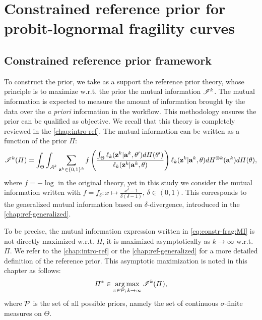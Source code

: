 \section{Constrained reference prior for probit-lognormal fragility curves}\label{sec:constr-frags:constrained}


\subsection{Constrained reference prior framework}\label{sec:constr-frags:subsec-constr-frame}



To construct the prior, we take as a support the reference prior theory, whose principle is to maximize w.r.t. the prior the mutual information $\mathscr{I}^k$. The mutual information is expected to measure the amount of information brought by the data over the \emph{a priori} information in the workflow. This methodology ensures the prior can be qualified as objective. We recall that this theory is completely reviewed in the \cref{chap:intro-ref}.
The mutual information can be written as a function of the prior $\varPi$:
\begin{equation}\label{eq:constr-frag:MI}
    \mathscr{I}^k(\varPi) = \int_{\Theta}\int_{\mathcal{A}^k}\sum_{\mathbf{z}^k\in\{0,1\}^k}f\left(\frac{\int_\Theta\ell_k(\mathbf{z}^k|\mathbf{a}^k,\theta')d\varPi(\theta')  }{\ell_k(\mathbf{z}^k|\mathbf{a}^k,\theta)}\right)\ell_k(\mathbf{z}^k|\mathbf{a}^k,\theta)dH^{\otimes k}(\mathbf{a}^k)d\varPi(\theta)  ,    
\end{equation}
where $f=-\log$ in the original theory, yet in this study we consider the mutual information written with $f=f_\delta:x\mapsto\frac{x^\delta-1}{\delta(\delta-1)}$, $\delta\in(0,1)$.
This corresponds to the generalized mutual information 
based on $\delta$-divergence, introduced in the \cref{chap:ref-generalized}. 

To be precise, the mutual information expression written in \cref{eq:constr-frag:MI} is not directly maximized w.r.t. $\varPi$, it is maximized asymptotically as $k\rightarrow\infty$ w.r.t. $\varPi$. We refer to the \cref{chap:intro-ref} or the \cref{chap:ref-generalized} for a more detailed definition of the reference prior. This asymptotic maximization is noted in this chapter as follows:
\begin{equation}\label{eq:constr-frag:optimnoconstr}
    \varPi^\ast\in\operatorname*{arg\,max}_{\pi\in\mathcal{P};\,k\rightarrow\infty}\mathscr{I}^k(\varPi),
\end{equation}
where $\mathcal{P}$ is the set of all possible priors, namely the set of continuous $\sigma$-finite measures on $\Theta$.

